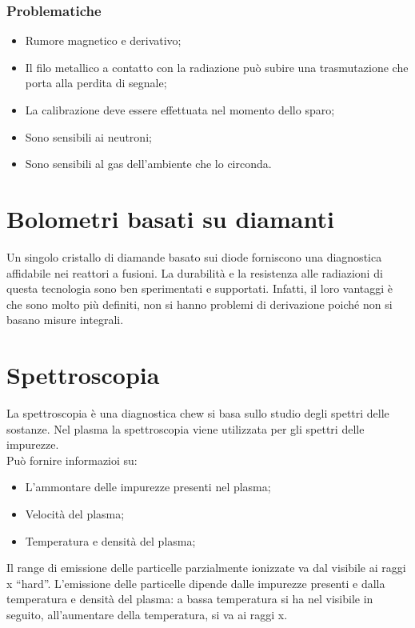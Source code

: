 \documentclass{article}
\begin{document}
\subsubsection{Problematiche}
\begin{itemize}
	\item Rumore magnetico e derivativo;
	\item Il filo metallico a contatto con la radiazione può subire una trasmutazione che porta alla perdita di segnale;
	\item La calibrazione deve essere effettuata nel momento dello sparo;
	\item Sono sensibili ai neutroni;
	\item Sono sensibili al gas dell'ambiente che lo circonda.
\end{itemize}
\section{Bolometri basati su diamanti}
Un singolo cristallo di diamande basato sui diode forniscono una diagnostica affidabile nei reattori a fusioni. La durabilità e la resistenza alle radiazioni di questa tecnologia sono ben sperimentati e supportati. Infatti, il loro vantaggi è che sono molto più definiti, non si hanno problemi di derivazione poiché non si basano misure integrali.
\section{Spettroscopia}
La spettroscopia è una diagnostica chew si basa sullo studio degli spettri delle sostanze. Nel plasma la spettroscopia viene utilizzata per gli spettri delle impurezze.\\
Può fornire informazioi su:\begin{itemize}
	\item L'ammontare delle impurezze presenti nel plasma;
	\item Velocità del plasma;
	\item Temperatura e densità del plasma;
\end{itemize}
Il range di emissione delle particelle parzialmente ionizzate va dal visibile ai raggi x ``hard''. L'emissione delle particelle dipende dalle impurezze presenti e dalla temperatura e densità del plasma: a bassa temperatura si ha nel visibile in seguito, all'aumentare della temperatura, si va ai raggi x.
\end{document}
